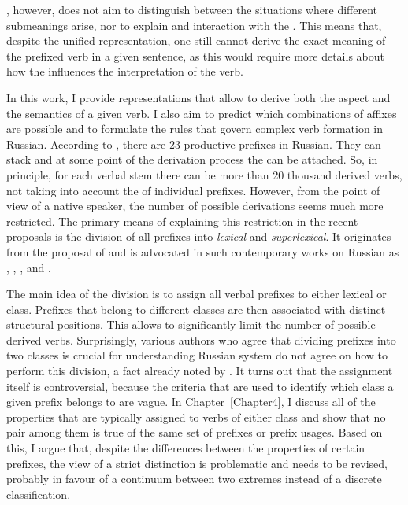 \citet{Kagan:book}, however, does not aim to distinguish between the situations where different submeanings arise, nor to explain  and interaction with the . This means that, despite the unified representation, one still cannot derive the exact meaning of the prefixed verb in a given sentence, as this would require more details about how the  influences the interpretation of the verb.

In this work, I provide representations that allow to derive both the aspect and the semantics of a given verb. I also aim to predict which combinations of affixes are possible and to formulate the rules that govern complex verb formation in Russian. According to \citet{Shvedova:82}, there are 23 productive prefixes in Russian. They can stack and at some point of the derivation process the  can be attached. So, in principle, for each verbal stem there can be more than 20 thousand derived verbs, not taking into account the  of individual prefixes. However, from the point of view of a native speaker, the number of possible derivations seems much more restricted. The primary means of explaining this restriction in the recent proposals is the division of all prefixes into \textit{lexical} and \textit{superlexical}. It originates from the proposal of \citet{Isachenko:60} and is advocated in such contemporary works on Russian  as \citet{Ramchand:04}, \citet{Svenonius:04b}, \citet{Romanova:06}, and \citet{Tatevosov:07, Tatevosov:09}.

The main idea of the division is to assign all verbal prefixes to either lexical or  class. Prefixes that belong to different classes are then associated with distinct structural positions. This allows to significantly limit the number of possible derived verbs. Surprisingly, various authors who agree that dividing prefixes into two classes is crucial for understanding Russian  system do not agree on how to perform this division, a fact already noted by \citet{Tatevosov:09}. It turns out that the assignment itself is controversial, because the criteria that are used to identify which class a given prefix belongs to are vague. In Chapter~\ref{Chapter4}, I discuss all of the properties that are typically assigned to verbs of either class and show that no pair among them is true of the same set of prefixes or prefix usages. Based on this, I argue that, despite the differences between the properties of certain prefixes, the view of a strict distinction is problematic and needs to be revised, probably in favour of a continuum between two extremes instead of a discrete classification. 

